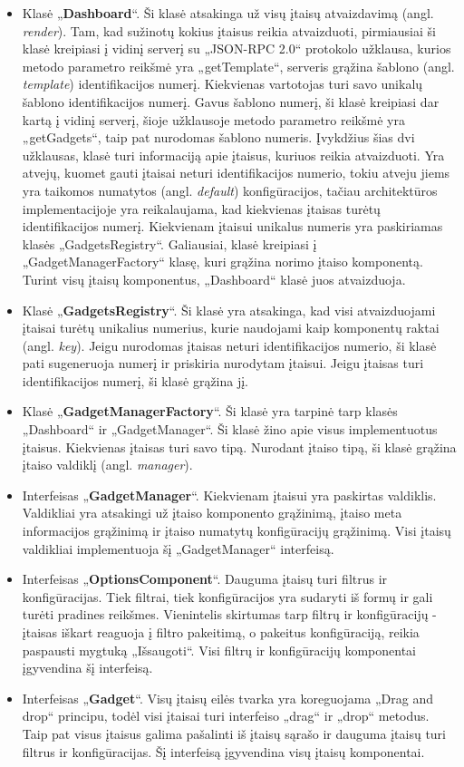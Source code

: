 \documentclass{VUMIFPSbakalaurinis}
\begin{document}
\begin{itemize}
    \item Klasė „\textbf{Dashboard}“. Ši klasė atsakinga už visų įtaisų atvaizdavimą (angl. \textit{render}). Tam, kad sužinotų kokius įtaisus reikia atvaizduoti, pirmiausiai ši klasė kreipiasi į vidinį serverį su „JSON-RPC 2.0“ protokolo užklausa, kurios metodo parametro reikšmė yra „getTemplate“, serveris grąžina šablono (angl. \textit{template}) identifikacijos numerį. Kiekvienas vartotojas turi savo unikalų šablono identifikacijos numerį. Gavus šablono numerį, ši klasė kreipiasi dar kartą į vidinį serverį, šioje užklausoje metodo parametro reikšmė yra „getGadgets“, taip pat nurodomas šablono numeris. Įvykdžius šias dvi užklausas, klasė turi informaciją apie įtaisus, kuriuos reikia atvaizduoti. Yra atvejų, kuomet gauti įtaisai neturi identifikacijos numerio, tokiu atveju jiems yra taikomos numatytos (angl. \textit{default}) konfigūracijos, tačiau architektūros implementacijoje yra reikalaujama, kad kiekvienas įtaisas turėtų identifikacijos numerį. Kiekvienam įtaisui unikalus numeris yra paskiriamas klasės „GadgetsRegistry“. Galiausiai, klasė kreipiasi į „GadgetManagerFactory“ klasę, kuri grąžina norimo įtaiso komponentą. Turint visų įtaisų komponentus, „Dashboard“ klasė juos atvaizduoja.
    \item Klasė „\textbf{GadgetsRegistry}“. Ši klasė yra atsakinga, kad visi atvaizduojami įtaisai turėtų unikalius numerius, kurie naudojami kaip komponentų raktai (angl. \textit{key}). Jeigu nurodomas įtaisas neturi identifikacijos numerio, ši klasė pati sugeneruoja numerį ir priskiria nurodytam įtaisui. Jeigu įtaisas turi identifikacijos numerį, ši klasė grąžina jį.
    \item Klasė „\textbf{GadgetManagerFactory}“. Ši klasė yra tarpinė tarp klasės „Dashboard“ ir „GadgetManager“. Ši klasė žino apie visus implementuotus įtaisus. Kiekvienas įtaisas turi savo tipą. Nurodant įtaiso tipą, ši klasė grąžina įtaiso valdiklį (angl. \textit{manager}). 
    \item Interfeisas „\textbf{GadgetManager}“. Kiekvienam įtaisui yra paskirtas valdiklis. Valdikliai yra atsakingi už įtaiso komponento grąžinimą, įtaiso meta informacijos grąžinimą ir įtaiso numatytų konfigūracijų grąžinimą. Visi įtaisų valdikliai implementuoja šį „GadgetManager“ interfeisą.
    \item Interfeisas „\textbf{OptionsComponent}“. Dauguma įtaisų turi filtrus ir konfigūracijas. Tiek filtrai, tiek konfigūracijos yra sudaryti iš formų ir gali turėti pradines reikšmes. Vienintelis skirtumas tarp filtrų ir konfigūracijų - įtaisas iškart reaguoja į filtro pakeitimą, o pakeitus konfigūraciją, reikia paspausti mygtuką „Išsaugoti“. Visi filtrų ir konfigūracijų komponentai įgyvendina šį interfeisą.
    \item Interfeisas „\textbf{Gadget}“. Visų įtaisų eilės tvarka yra koreguojama „Drag and drop“ principu, todėl visi įtaisai turi interfeiso „drag“ ir „drop“ metodus. Taip pat visus įtaisus galima pašalinti iš įtaisų sąrašo ir dauguma įtaisų turi filtrus ir konfigūracijas. Šį interfeisą įgyvendina visų įtaisų komponentai.
\end{itemize}
\end{document}
